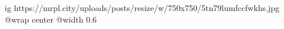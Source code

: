  
 
 
 
 

\ifcmt
  ig https://mrpl.city/uploads/posts/resize/w/750x750/5tn79lumfccfwkhs.jpg
  @wrap center
  @width 0.6
\fi
